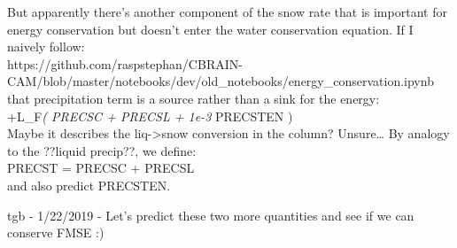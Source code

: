 \documentclass[11pt]{article}
\begin{document}
But apparently there's another component of the snow rate that is
important for energy conservation but doesn't enter the water
conservation equation. If I naively follow:\\
https://github.com/raspstephan/CBRAIN-CAM/blob/master/notebooks/dev/old\_notebooks/energy\_conservation.ipynb\\
that precipitation term is a source rather than a sink for the energy:\\
+L\_F\emph{( PRECSC + PRECSL + 1e-3 } PRECSTEN )\\
Maybe it describes the liq-\textgreater{}snow conversion in the column?
Unsure\ldots{} By analogy to the ??liquid precip??, we define:\\
PRECST = PRECSC + PRECSL\\
and also predict PRECSTEN.

tgb - 1/22/2019 - Let's predict these two more quantities and see if we
can conserve FMSE :)
\end{document}

